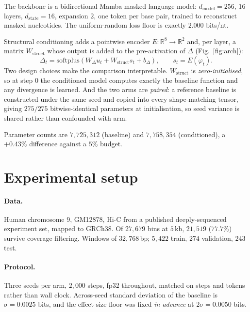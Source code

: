 \documentclass[10pt]{article}
\begin{document}
The backbone is a bidirectional Mamba masked language model: $d_{\text{model}}
= 256$, $16$ layers, $d_{\text{state}} = 16$, expansion $2$, one token per base
pair, trained to reconstruct masked nucleotides. The uniform-random loss floor
is exactly $2.000$ bits/nt.

Structural conditioning adds a pointwise encoder $E: \mathbb{R}^{8} \to
\mathbb{R}^{2}$ and, per layer, a matrix $W_{\text{struct}}$ whose output is
added to the pre-activation of $\Delta$ (Fig.~\ref{fig:arch}):
\begin{equation}
\Delta_t = \mathrm{softplus}\!\left(W_\Delta u_t + W_{\text{struct}} s_t + b_\Delta\right),
\qquad s_t = E(\varphi_t).
\end{equation}
Two design choices make the comparison interpretable. $W_{\text{struct}}$ is
\emph{zero-initialised}, so at step $0$ the conditioned model computes exactly
the baseline function and any divergence is learned. And the two arms are
\emph{paired}: a reference baseline is constructed under the same seed and copied
into every shape-matching tensor, giving $275/275$ bitwise-identical parameters
at initialisation, so seed variance is shared rather than confounded with arm.

Parameter counts are $7{,}725{,}312$ (baseline) and $7{,}758{,}354$
(conditioned), a $+0.43\%$ difference against a $5\%$ budget.

\section{Experimental setup}

\paragraph{Data.} Human chromosome 9, GM12878, Hi-C from a published
deeply-sequenced experiment set, mapped to GRCh38. Of $27{,}679$ bins at $5$\,kb,
$21{,}519$ ($77.7\%$) survive coverage filtering. Windows of $32{,}768$\,bp;
$5{,}422$ train, $274$ validation, $243$ test.

\paragraph{Protocol.} Three seeds per arm, $2{,}000$ steps, fp32 throughout,
matched on steps and tokens rather than wall clock. Across-seed standard
deviation of the baseline is $\sigma = 0.0025$ bits, and the effect-size floor
was fixed \emph{in advance} at $2\sigma = 0.0050$ bits.
\end{document}
